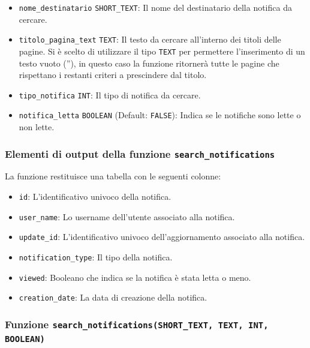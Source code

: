 \documentclass{article}
\begin{document}
	\begin{itemize}
		\item \texttt{nome\_destinatario} \texttt{SHORT\_TEXT}: Il nome del destinatario della notifica da cercare.
		\item \texttt{titolo\_pagina\_text} \texttt{TEXT}: Il testo da cercare all'interno dei titoli delle pagine. Si è scelto di utilizzare il tipo \texttt{TEXT} per permettere l'inserimento di un testo vuoto (''), in questo caso la funzione ritornerà tutte le pagine che rispettano i restanti criteri a prescindere dal titolo. 
		\item \texttt{tipo\_notifica} \texttt{INT}: Il tipo di notifica da cercare.
		\item \texttt{notifica\_letta} \texttt{BOOLEAN} (Default: \texttt{FALSE}): Indica se le notifiche sono lette o non lette.
		\\
	\end{itemize}
	
	
	
	
	\subsubsection{Elementi di output della funzione \texttt{search\_notifications}}
	
	La funzione restituisce una tabella con le seguenti colonne:
	
	\begin{itemize}
		\item \texttt{id}: L'identificativo univoco della notifica.
		\item \texttt{user\_name}: Lo username dell'utente associato alla notifica.
		\item \texttt{update\_id}: L'identificativo univoco dell'aggiornamento associato alla notifica.
		\item \texttt{notification\_type}: Il tipo della notifica.
		\item \texttt{viewed}: Booleano che indica se la notifica è stata letta o meno.
		\item \texttt{creation\_date}: La data di creazione della notifica.
	\end{itemize}
	
	
\subsubsection{Funzione \texttt{search\_notifications(SHORT\_TEXT, TEXT, INT, BOOLEAN)}}
	
\end{document}
